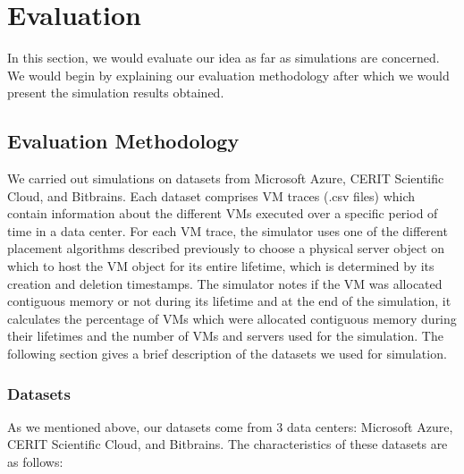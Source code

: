 \documentclass[sigconf]{sigplanconf}
\begin{document}
      
     
      
  \section{Evaluation}
  In this section, we would evaluate our idea as far as simulations are concerned. We would begin by explaining our evaluation methodology after which we would present the simulation results obtained. 
  
  \subsection{Evaluation Methodology}
  We carried out simulations on datasets from Microsoft Azure, CERIT Scientific Cloud, and Bitbrains. Each dataset comprises VM traces (.csv files) which contain information about the different VMs executed over a specific period of time in a data center. For each VM trace, the simulator uses one of the different placement algorithms described previously to choose a physical server object on which to host the VM object for its entire lifetime, which is determined by its creation and deletion timestamps. The simulator notes if the VM was allocated contiguous memory or not during its lifetime and at the end of the simulation, it calculates the percentage of VMs which were allocated contiguous memory during their lifetimes and the number of VMs and servers used for the simulation. The following section gives a brief description of the datasets we used for simulation.
  
  \subsubsection{Datasets} 
  As we mentioned above, our datasets come from 3 data centers: Microsoft Azure, CERIT Scientific Cloud, and Bitbrains. The characteristics of these datasets are as follows:
\end{document}
